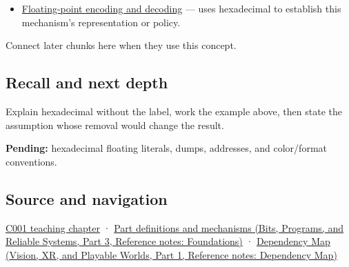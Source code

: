\hypertarget{appendix-6b8075763724-used-by}{}

\begin{itemize}
\tightlist
\item
  \hyperref[appendix-6854d0e2218e]{Floating-point encoding and decoding} --- uses hexadecimal to establish this mechanism's representation or policy.
\end{itemize}

Connect later chunks here when they use this concept.

\subsection{Recall and next depth}\label{appendix-6b8075763724-recall-and-next-depth}

\hypertarget{appendix-6b8075763724-recall-and-next-depth}{}

Explain hexadecimal without the label, work the example above, then state the assumption whose removal would change the result.

\textbf{Pending:} hexadecimal floating literals, dumps, addresses, and color/format conventions.

\subsection{Source and navigation}\label{appendix-6b8075763724-source-and-navigation}

\hypertarget{appendix-6b8075763724-source-and-navigation}{}

\hyperref[01-foundations-i-ch001-from-a-signal-to-an-interpretation]{C001 teaching chapter} · \href{../01-Bits-Programs-and-Reliable-Systems-P03/main.pdf\#nameddest=appendix-fd090d982a15}{Part definitions and mechanisms (Bits, Programs, and Reliable Systems, Part 3, Reference notes: Foundations)} · \href{../07-Vision-XR-and-Playable-Worlds-P01/main.pdf\#nameddest=appendix-4ad47bdd269a}{Dependency Map (Vision, XR, and Playable Worlds, Part 1, Reference notes: Dependency Map)}
